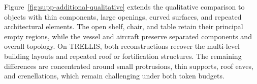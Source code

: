 Figure~\ref{fig:supp-additional-qualitative} extends the qualitative comparison
to objects with thin components, large openings, curved surfaces, and repeated
architectural elements. The open shelf, chair, and table retain their principal
empty regions, while the vessel and aircraft preserve separated components and
overall topology. On TRELLIS, both reconstructions recover the multi-level
building layouts and repeated roof or fortification structures. The remaining
differences are concentrated around small protrusions, thin supports, roof
eaves, and crenellations, which remain challenging under both token budgets.



\clearpage

\makeatletter
\setlength{\@fptop}{0pt plus 1fil}
\makeatother



